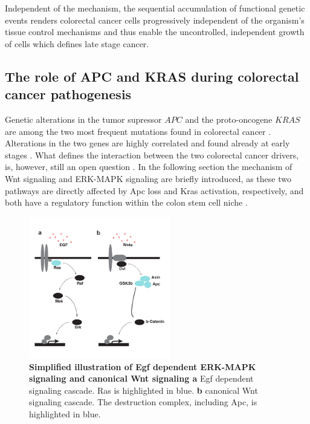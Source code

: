 \begin{flushleft}
Independent of the mechanism, the sequential accumulation of functional genetic events renders colorectal cancer cells progressively independent of the organism's tissue control mechanisms and thus enable the uncontrolled, independent growth of cells which defines late stage cancer.

\subsection{The role of APC and KRAS during colorectal cancer pathogenesis}
Genetic alterations in the tumor supressor $APC$ and the proto-oncogene $KRAS$ are among the two most frequent mutations found in colorectal cancer \citep{markowitzMolecularOriginsCancer2009}. Alterations in the two genes are highly correlated and found already at early stages \citep{minaConditionalSelectionGenomic2017}. What defines the interaction between the two colorectal cancer drivers, is, however, still an open question \citep{parsonsWNTDriverDependency2021}. In the following section the mechanism of Wnt signaling and ERK-MAPK signaling are briefly introduced, as these two pathways are directly affected by Apc loss and Kras activation, respectively, and both have a regulatory function within the colon stem cell niche \citep{hTalesCryptNew2019}.

\begin{figure}[h]
\centering
\includegraphics[width=0.55\textwidth,
                keepaspectratio]{figures/adenomaprofiling/pdf/fig_0_1.pdf}
\caption[Simplified illustration of ERK-MAPK signaling and canonical Wnt signaling]{\textbf{Simplified illustration of Egf dependent ERK-MAPK signaling and canonical Wnt signaling a} Egf dependent signaling cascade. Ras is highlighted in blue. \textbf{b} canonical Wnt signaling cascade. The destruction complex, including Apc, is highlighted in blue.}
\label{fig_180}
\end{figure}
\bigbreak


\end{flushleft}
